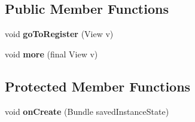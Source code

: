 \subsection*{Public Member Functions}
\begin{DoxyCompactItemize}
\item 
void {\bfseries go\+To\+Register} (View v)\hypertarget{classcom_1_1example_1_1sebastian_1_1tindertp_1_1InterestsActivity_ace9e14948bd77770f6319b9101a4ae25}{}\label{classcom_1_1example_1_1sebastian_1_1tindertp_1_1InterestsActivity_ace9e14948bd77770f6319b9101a4ae25}

\item 
void {\bfseries more} (final View v)\hypertarget{classcom_1_1example_1_1sebastian_1_1tindertp_1_1InterestsActivity_aefd0a04294a94c6841130af0b27b3660}{}\label{classcom_1_1example_1_1sebastian_1_1tindertp_1_1InterestsActivity_aefd0a04294a94c6841130af0b27b3660}

\end{DoxyCompactItemize}
\subsection*{Protected Member Functions}
\begin{DoxyCompactItemize}
\item 
void {\bfseries on\+Create} (Bundle saved\+Instance\+State)\hypertarget{classcom_1_1example_1_1sebastian_1_1tindertp_1_1InterestsActivity_a8170231a6d7ca77c0d5eab6d9b778c5a}{}\label{classcom_1_1example_1_1sebastian_1_1tindertp_1_1InterestsActivity_a8170231a6d7ca77c0d5eab6d9b778c5a}

\end{DoxyCompactItemize}
